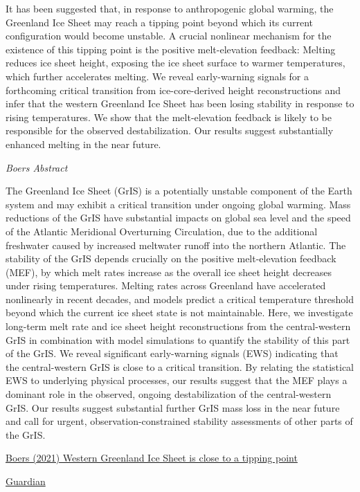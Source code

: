 \documentclass[
]{book}
\begin{document}
It has been suggested that, in response to anthropogenic global warming, the Greenland Ice Sheet may reach a tipping point beyond which its current configuration would become unstable. A crucial nonlinear mechanism for the existence of this tipping point is the positive melt-elevation feedback: Melting reduces ice sheet height, exposing the ice sheet surface to warmer temperatures, which further accelerates melting. We reveal early-warning signals for a forthcoming critical transition from ice-core-derived height reconstructions and infer that the western Greenland Ice Sheet has been losing stability in response to rising temperatures. We show that the melt-elevation feedback is likely to be responsible for the observed destabilization. Our results suggest substantially enhanced melting in the near future.

\emph{Boers Abstract}

The Greenland Ice Sheet (GrIS) is a potentially unstable component of the Earth system and may exhibit a critical transition under ongoing global warming. Mass reductions of the GrIS have substantial impacts on global sea level and the speed of the Atlantic Meridional Overturning Circulation, due to the additional freshwater caused by increased meltwater runoff into the northern Atlantic. The stability of the GrIS depends crucially on the positive melt-elevation feedback (MEF), by which melt rates increase as the overall ice sheet height decreases under rising temperatures. Melting rates across Greenland have accelerated nonlinearly in recent decades, and models predict a critical temperature threshold beyond which the current ice sheet state is not maintainable. Here, we investigate long-term melt rate and ice sheet height reconstructions from the central-western GrIS in combination with model simulations to quantify the stability of this part of the GrIS. We reveal significant early-warning signals (EWS) indicating that the central-western GrIS is close to a critical transition. By relating the statistical EWS to underlying physical processes, our results suggest that the MEF plays a dominant role in the observed, ongoing destabilization of the central-western GrIS. Our results suggest substantial further GrIS mass loss in the near future and call for urgent, observation-constrained stability assessments of other parts of the GrIS.

\href{https://www.pnas.org/content/118/21/e2024192118}{Boers (2021) Western Greenland Ice Sheet is close to a tipping point}

\href{https://www.theguardian.com/environment/2021/may/17/greenland-ice-sheet-on-brink-of-major-tipping-point-says-study}{Guardian}
\end{document}
